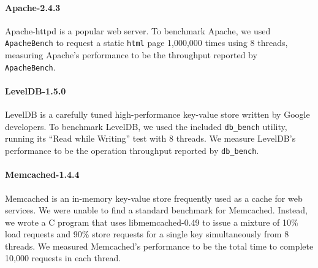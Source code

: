 \documentclass[preprint,9pt]{sigplanconf}
\begin{document}
\paragraph{Apache-2.4.3} 
Apache-httpd is a popular web server.  To benchmark Apache, we used {\tt
ApacheBench} to request a static {\tt html} page 1,000,000 times using 8 threads,
measuring Apache's performance to be the throughput reported by {\tt
ApacheBench}.  

\paragraph{LevelDB-1.5.0}
LevelDB is a carefully tuned high-performance key-value store written by Google
developers. To benchmark LevelDB, we used the included {\tt db\_bench} utility,
running its ``Read while Writing'' test with 8 threads.  We measure LevelDB's
performance to be the operation throughput reported by {\tt db\_bench}.

\paragraph{Memcached-1.4.4}
Memcached is an in-memory key-value store frequently used as a cache for web
services.  We were unable to find a standard benchmark for Memcached.  Instead,
we wrote a C program that uses libmemcached-0.49 to issue a
mixture of 10\% load requests and 90\% store requests for a single key 
simultaneously from 8 threads.  We measured Memcached's performance to be the
total time to complete 10,000 requests in each thread.
\end{document}
